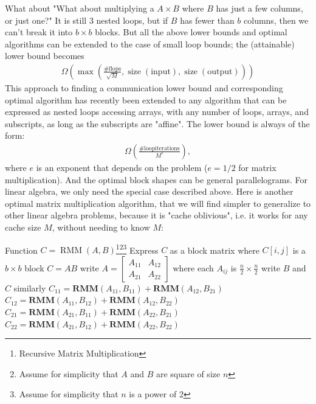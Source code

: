\documentclass[11pt]{article}
\numberwithin{equation}{section}
\begin{document}
What about "What about multiplying a $A \times B$ where $B$ has just a few columns, or just one?" It is still 3 nested loops,
but if $B$ has fewer than $b$ columns, then we can't break it into $b \times b$ blocks. 
But all the above lower bounds and optimal algorithms can be extended to the case of small loop bounds; the (attainable) lower bound becomes \begin{align*}
    \Omega (\max (\frac{\#\mathrm{flops}}{\sqrt{M}}, \operatorname{size}(\mathrm{input}), \operatorname{size}(\mathrm{output})))
\end{align*}
This approach to finding a communication lower bound and corresponding optimal algorithm has recently been extended to any algorithm that
can be expressed as nested loops accessing arrays, with any number of loops, arrays, and subscripts, as long as the subscripts are "affine". 
The lower bound is always of the form: \begin{align*}
    \Omega(\frac{\#\mathrm{loop iterations}}{M^e}),
\end{align*}
 where $e$ is an exponent that depends on the problem ($e=1/2$ for matrix multiplication). And the optimal block shapes can be general parallelograms.
For linear algebra, we only need the special case described above. Here is another optimal matrix multiplication algorithm, 
that we will find simpler to generalize to other linear algebra problems, because it is "cache oblivious", i.e. it works for any cache size $M$, 
without needing to know $M$:

\begin{savenotes}
    \begin{algorithmfrm}
        \begin{algorithmic}[1]
            \State Function $C = \operatorname{RMM}(A,B)$\footnote{Recursive Matrix Multiplication}\footnote{Assume for simplicity that $A$ and $B$ are square of size $n$}\footnote{Assume for simplicity that $n$ is a power of 2}
            \State Express $C$ as a block matrix where $C[i,j]$ is a $b \times b$ block 
                \State $C=AB$
            \Else 
                \State write $A=\left[\begin{array}{ll}
                    A_{11} & A_{12} \\
                    A_{21} & A_{22}
                    \end{array}\right]$ where each $A_{ij}$ is $\frac{n}{2} \times \frac{n}{2}$
                \State write $B$ and $C$ similarly
                \State $C_{11} = \mathbf{RMM}(A_{11},B_{11}) + \mathbf{RMM}(A_{12},B_{21})$
                \State $C_{12} = \mathbf{RMM}(A_{11},B_{12}) + \mathbf{RMM}(A_{12},B_{22})$
                \State $C_{21} = \mathbf{RMM}(A_{21},B_{11}) + \mathbf{RMM}(A_{22},B_{21})$
                \State $C_{22} = \mathbf{RMM}(A_{21},B_{12}) + \mathbf{RMM}(A_{22},B_{22})$
            \EndIf 
        \end{algorithmic}
    \end{algorithmfrm}
\end{savenotes}
\end{document}
